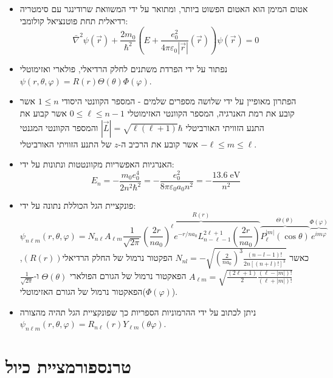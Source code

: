 \documentclass{tstextbook}
\begin{document}
\begin{summary}
  \begin{itemize}
    \item אטום המימן הוא האטום הפשוט ביותר, ומתואר על ידי המשוואת שרודינגר עם סימטריה רדיאלית תחת פוטנציאל קולומבי:
$$ \bar{\nabla}^2 \psi\left(\vec{r}\right)+\frac{2m_{0}}{\hbar^{2}}\left(E+\frac{e_{0}^{2}}{4\pi\varepsilon_{0}\left|\vec{r}\right|}\left(\vec{r}\right)\right) \psi\left(\vec{r}\right)=0 $$
    \item נפתור על ידי הפרדת משתנים לחלק הרדיאלי, פולארי ואזימוטלי \(\psi \left(r,\theta,\varphi\right) =R\left(r\right) \Theta\left(\theta\right) \Phi\left(\varphi\right)\).
    \item הפתרון מאופיין על ידי שלושה מספרים שלמים - המספר הקוונטי היסודי \(1\leq n\) אשר קובע את רמת האנרגיה, המספר הקוונטי האזימוטלי \(0\leq \ell \leq n-1\) אשר קבוע את התנע הזוויתי האורביטלי \(|\vec{L}| = \sqrt{\ell(\ell+1)}\hbar\) והמספר הקוונטי המגנטי \(-\ell \leq m\leq \ell\) אשר קובע את הרכיב ה-\(z\) של התנע הזוויתי האורביטלי.
    \item האנרגיות האפשריות מקוונטטות ונתונות על ידי:
$$ E_{n} = -{\frac{m_{0} e_{0}^{4}}{2n^{2}\hbar^{2}}} = -\frac{e_{0}^{2}}{8\pi\varepsilon_{0}a_{0}n^{2}} = -\frac{13.6 \; \mathrm{eV}}{n^{2}} $$
    \item פונקציית הגל הכוללת נתונה על ידי:
$$ \psi_{n\ell m}\left( r, \theta, \varphi \right) = N_{n\ell} A_{\ell m} \frac{1}{\sqrt{2\pi}}  \overbrace{\left( \frac{2r}{n a_0} \right)^\ell e^{-r/na_0} L_{n-\ell-1}^{2\ell+1} \left( \frac{2r}{n a_0} \right) }^{ R(r) } \overbrace{ P_{\ell}^{|m|} \left( \cos \theta \right) }^{ \Theta\left( \theta \right) } \overbrace{ e^{im\varphi} }^{ \Phi\left( \varphi \right) } $$
כאשר \(N_{n l}=-\sqrt{\left(\frac{2}{n a_{0}}\right)^{3}\frac{(n-l-1)!}{2n[(n+l)!]^{3}}}\) הפקטור נרמול של החלק הרדיאלי\((R(r))\), \(A_{\ell m} = \sqrt{ \frac{(2\ell+1)}{2} \frac{(\ell-|m|)!}{(\ell+|m|)!} }\) הפאקטור נרמול של הגורם הפולארי \(\Theta\left( \theta \right)\) ו-\(\frac{1}{\sqrt{2\pi}}\) הפאקטור נרמול של הגורם האזימוטלי(\(\Phi\left( \varphi \right)\)).
    \item ניתן לכתוב על ידי ההרמוניות הספריות כך שפונקציית הגל תהיה מהצורה \(\psi_{n\ell m}\left( r,\theta,\varphi \right)=R_{n\ell}(r)Y_{\ell m}\left( \theta \varphi \right)\).
  \end{itemize}
\end{summary}

\section{טרנספורמציית כיול}
\end{document}
